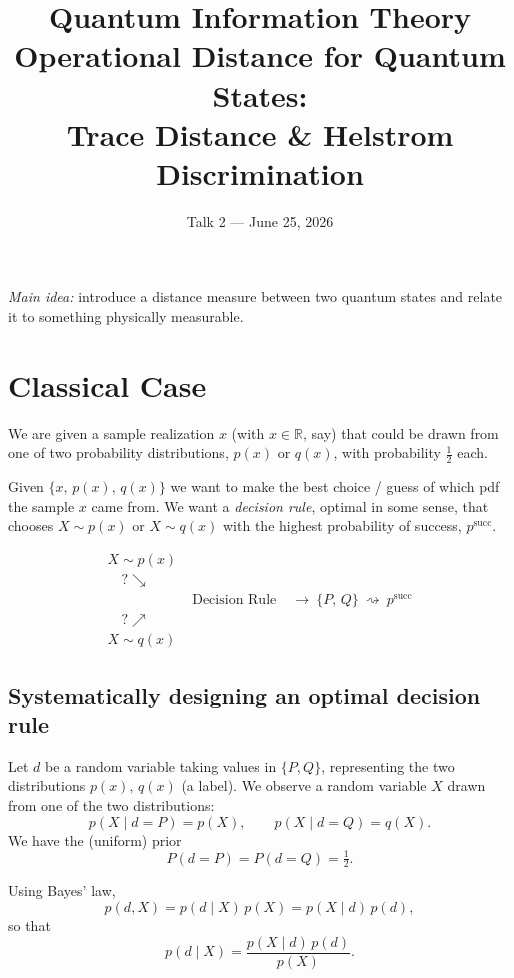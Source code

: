 \documentclass[11pt]{article}
\title{\textbf{Quantum Information Theory}\\[4pt]
Operational Distance for Quantum States:\\
Trace Distance \& Helstrom Discrimination}
\author{}
\date{Talk 2 --- June 25, 2026}
\newcommand{\R}{\mathbb{R}}
\begin{document}
\maketitle

\noindent\emph{Main idea:} introduce a distance measure between two quantum
states and relate it to something physically measurable.

\section{Classical Case}

We are given a sample realization $x$ (with $x\in\R$, say) that could be drawn
from one of two probability distributions, $p(x)$ or $q(x)$, with probability
$\tfrac12$ each.

\medskip
Given $\{x,\,p(x),\,q(x)\}$ we want to make the best choice / guess of which
pdf the sample $x$ came from. We want a \emph{decision rule}, optimal in some
sense, that chooses $X\sim p(x)$ or $X\sim q(x)$ with the highest probability
of success, $p^{\mathrm{succ}}$.

\[
\begin{array}{ccc}
X\sim p(x) \\[2pt]
\quad ? \searrow \\
& \boxed{\;\text{Decision Rule}\;}
& \longrightarrow\ \{P,\,Q\} \ \rightsquigarrow\ p^{\mathrm{succ}} \\
\quad ? \nearrow \\[2pt]
X\sim q(x)
\end{array}
\]

\subsection{Systematically designing an optimal decision rule}

Let $d$ be a random variable taking values in $\{P,Q\}$, representing the two
distributions $p(x),\,q(x)$ (a label). We observe a random variable $X$ drawn
from one of the two distributions:
\[
p(X\mid d=P) = p(X), \qquad
p(X\mid d=Q) = q(X).
\]
We have the (uniform) prior
\[
P(d=P) = P(d=Q) = \tfrac12 .
\]

Using Bayes' law,
\[
p(d,X) = p(d\mid X)\,p(X) = p(X\mid d)\,p(d),
\]
so that
\[
p(d\mid X) = \frac{p(X\mid d)\,p(d)}{p(X)} .
\]
\end{document}
